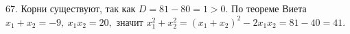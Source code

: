 67. Корни существуют, так как $D=81-80=1>0.$ По теореме Виета $x_1+x_2=-9,\ x_1x_2=20,$ значит $x_1^2+x_2^2=(x_1+x_2)^2-2x_1x_2=81-40=41.$\\
